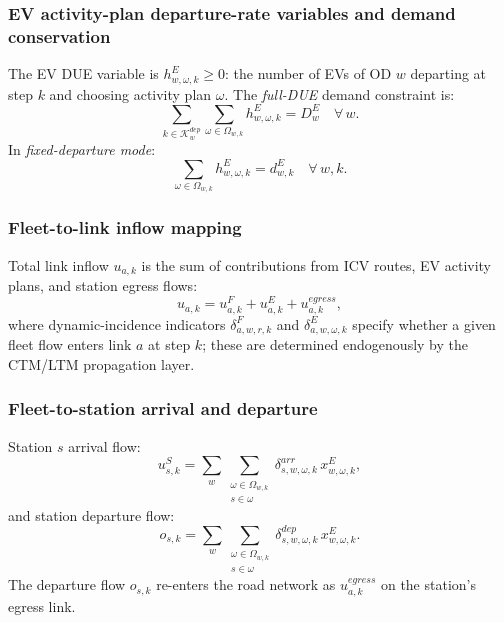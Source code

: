 \subsubsection{EV activity-plan departure-rate variables and demand conservation}

The EV DUE variable is $h^E_{w,\omega,k} \ge 0$: the number of EVs of
OD $w$ departing at step $k$ and choosing activity plan $\omega$.
The \emph{full-DUE} demand constraint is:
\begin{equation}
  \sum_{k \in \mathcal{K}^{dep}_w}
  \sum_{\omega \in \Omega_{w,k}}
  h^E_{w,\omega,k}
  = D^E_w
  \quad \forall\, w.
  \label{eq:ev-conservation-due}
\end{equation}
In \emph{fixed-departure mode}:
\begin{equation}
  \sum_{\omega \in \Omega_{w,k}} h^E_{w,\omega,k} = d^E_{w,k}
  \quad \forall\, w, k.
  \label{eq:ev-conservation}
\end{equation}

\subsubsection{Fleet-to-link inflow mapping}

Total link inflow $u_{a,k}$ is the sum of contributions from ICV routes,
EV activity plans, and station egress flows:
\begin{equation}
  u_{a,k} = u^F_{a,k} + u^E_{a,k} + u^{egress}_{a,k},
  \label{eq:link-inflow-total}
\end{equation}
where dynamic-incidence indicators $\delta^F_{a,w,r,k}$ and
$\delta^E_{a,w,\omega,k}$ specify whether a given fleet flow enters
link $a$ at step $k$; these are determined endogenously by the
CTM/LTM propagation layer.

\subsubsection{Fleet-to-station arrival and departure}

Station $s$ arrival flow:
\begin{equation}
  u^S_{s,k}
  = \sum_{w} \sum_{\substack{\omega \in \Omega_{w,k} \\ s \in \omega}}
    \delta^{arr}_{s,w,\omega,k}\, x^E_{w,\omega,k},
  \label{eq:station-arrival}
\end{equation}
and station departure flow:
\begin{equation}
  o_{s,k}
  = \sum_{w} \sum_{\substack{\omega \in \Omega_{w,k} \\ s \in \omega}}
    \delta^{dep}_{s,w,\omega,k}\, x^E_{w,\omega,k}.
  \label{eq:station-departure}
\end{equation}
The departure flow $o_{s,k}$ re-enters the road network as
$u^{egress}_{a,k}$ on the station's egress link.

